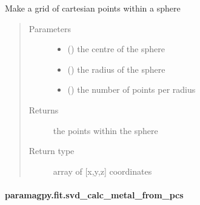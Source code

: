 \documentclass[a4paper,10pt,english,openany,oneside]{sphinxmanual}
\begin{document}
\begin{fulllineitems}
\label{\detokenize{reference/generated/paramagpy.fit.sphere_grid:paramagpy.fit.sphere_grid}}
\sphinxAtStartPar
Make a grid of cartesian points within a sphere
\begin{quote}\begin{description}
\item[{Parameters}] \leavevmode\begin{itemize}
\item {} 
\sphinxAtStartPar
{} () \textendash{} the centre of the sphere

\item {} 
\sphinxAtStartPar
{} () \textendash{} the radius of the sphere

\item {} 
\sphinxAtStartPar
{} () \textendash{} the number of points per radius

\end{itemize}

\item[{Returns}] \leavevmode
\sphinxAtStartPar
{} \textendash{} the points within the sphere

\item[{Return type}] \leavevmode
\sphinxAtStartPar
array of {[}x,y,z{]} coordinates

\end{description}\end{quote}

\end{fulllineitems}



\paragraph{paramagpy.fit.svd\_calc\_metal\_from\_pcs}
\label{\detokenize{reference/generated/paramagpy.fit.svd_calc_metal_from_pcs:paramagpy-fit-svd-calc-metal-from-pcs}}\label{\detokenize{reference/generated/paramagpy.fit.svd_calc_metal_from_pcs::doc}}
\end{document}
